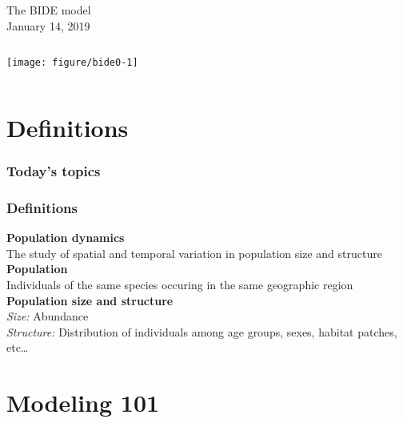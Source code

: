 \documentclass[color=usenames,dvipsnames]{beamer}\usepackage[]{graphicx}\usepackage[]{color}
\begin{document}
\begin{frame}
  \centering
    \huge
    The BIDE model \\
    \large
    January 14, 2019 \\
    \vfill

\begin{columns}
  \column{\dimexpr\paperwidth-10pt}
  \centering
  \texttt{[image: figure/bide0-1]} \\
\end{columns}
\end{frame}



\section{Definitions}


\begin{frame}
  \frametitle{Today's topics}
  \LARGE
\end{frame}


\begin{frame}
  \frametitle{Definitions}
  {\bf Population dynamics \\}
    The study of spatial and temporal variation in population size and structure
  \pause
  \vfill
  {\bf Population \\}
    Individuals of the same species occuring in the same geographic region
  \pause
  \vfill
  {\bf Population size and structure \\}
    {\color{Red}
      \it Size:} Abundance \\
    {\color{Red}
      \it Structure:} Distribution of individuals among age groups, sexes,
    habitat patches, etc\dots
\end{frame}



\section{Modeling 101}
\end{document}
